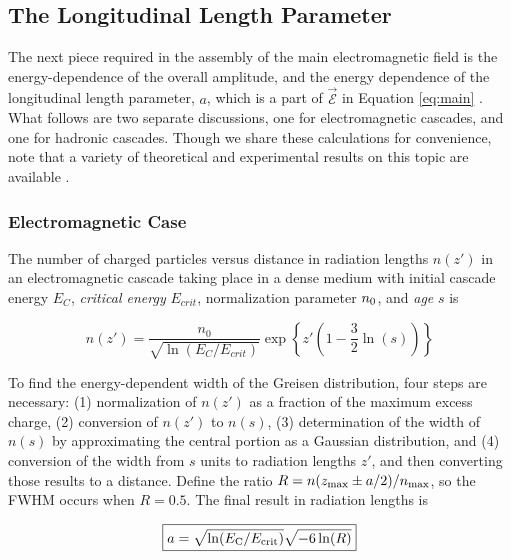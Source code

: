 \documentclass[amsmath,amssymb,aps,prd,10pt,twocolumn]{revtex4}
\begin{document}
\subsection{The Longitudinal Length Parameter}
\label{sec:ff2}

The next piece required in the assembly of the main electromagnetic field is the energy-dependence of the overall amplitude, and the energy dependence of the longitudinal length parameter, $a$, which is a part of $\vec{\mathcal{E}}$ in Equation \ref{eq:main} \cite{10.1103/physrevd.65.016003}.  What follows are two separate discussions, one for electromagnetic cascades, and one for hadronic cascades.  Though we share these calculations for convenience, note that a variety of theoretical and experimental results on this topic are available \cite{saltzberg} \cite{ANDRINGA2011360} \cite{10.1088/1742-6596/1879/3/032089}.  

\subsubsection{Electromagnetic Case}

The number of charged particles versus distance in radiation lengths $n(z')$ in an electromagnetic cascade taking place in a dense medium with initial cascade energy $E_C$, \textit{critical energy} $E_{crit}$, normalization parameter $n_{\rm 0}$, and \textit{age} $s$ is \cite{10.1016/j.astropartphys.2017.03.008}

\begin{equation}
n(z') = \frac{n_0}{\sqrt{\ln(E_C/E_{crit})}} \exp \left \lbrace z'\left(1 - \frac{3}{2}\ln(s) \right) \right \rbrace
\end{equation}

To find the energy-dependent width of the Greisen distribution, four steps are necessary: (1) normalization of $n(z')$ as a fraction of the maximum excess charge, (2) conversion of $n(z')$ to $n(s)$, (3) determination of the width of $n(s)$ by approximating the central portion as a Gaussian distribution, and (4) conversion of the width from $s$ units to radiation lengths $z'$, and then converting those results to a distance.  Define the ratio $R = n(z_{\rm max} \pm a/2)/n_{\rm max}$, so the FWHM occurs when $R = 0.5$.  The final result in radiation lengths is

\begin{equation}
\boxed{
a = \sqrt{\ln(E_{\rm C}/E_{\rm crit})} \sqrt{-6\ln(R)}
} \label{eq:main_1}
\end{equation}
\end{document}
